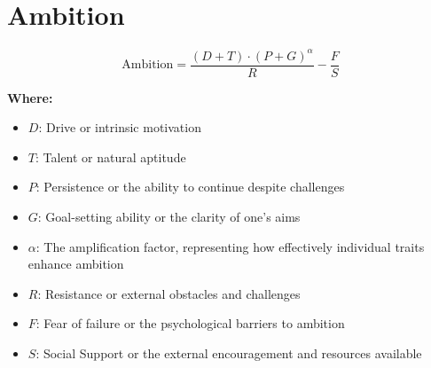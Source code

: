\chapter{Ambition}

\begin{equation}
\text{Ambition} = \frac{{(D + T) \cdot (P + G)^{\alpha}}}{R} - \frac{F}{S}
\end{equation}

\textbf{Where:}

\begin{itemize}
    \item $D$: Drive or intrinsic motivation
    \item $T$: Talent or natural aptitude
    \item $P$: Persistence or the ability to continue despite challenges
    \item $G$: Goal-setting ability or the clarity of one's aims
    \item $\alpha$: The amplification factor, representing how effectively individual traits enhance ambition
    \item $R$: Resistance or external obstacles and challenges
    \item $F$: Fear of failure or the psychological barriers to ambition
    \item $S$: Social Support or the external encouragement and resources available
\end{itemize}
